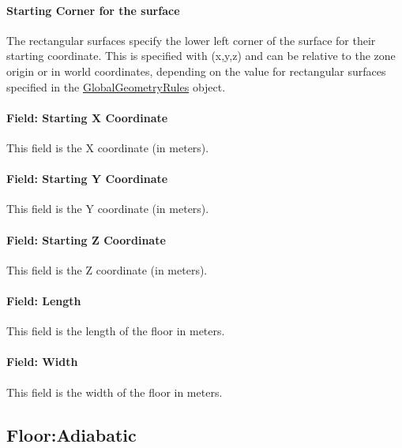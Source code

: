 \paragraph{Starting Corner for the surface}\label{starting-corner-for-the-surface-7}

The rectangular surfaces specify the lower left corner of the surface for their starting coordinate. This is specified with (x,y,z) and can be relative to the zone origin or in world coordinates, depending on the value for rectangular surfaces specified in the \hyperref[globalgeometryrules]{GlobalGeometryRules} object.

\paragraph{Field: Starting X Coordinate}\label{field-starting-x-coordinate-7}

This field is the X coordinate (in meters).

\paragraph{Field: Starting Y Coordinate}\label{field-starting-y-coordinate-7}

This field is the Y coordinate (in meters).

\paragraph{Field: Starting Z Coordinate}\label{field-starting-z-coordinate-7}

This field is the Z coordinate (in meters).

\paragraph{Field: Length}\label{field-length-7}

This field is the length of the floor in meters.

\paragraph{Field: Width}\label{field-width-3}

This field is the width of the floor in meters.

\subsection{Floor:Adiabatic}\label{flooradiabatic}

